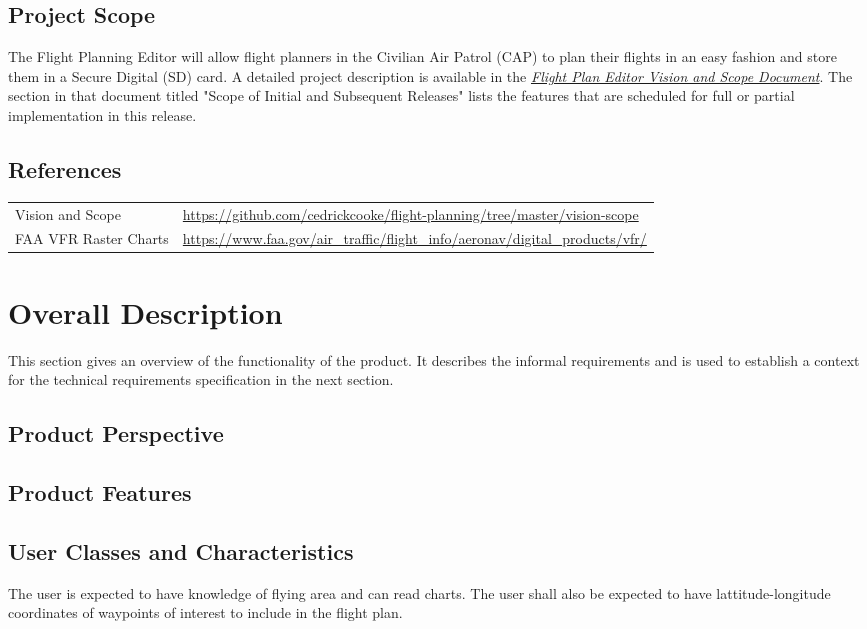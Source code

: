 \documentclass[12pt, letterpaper]{article}
\begin{document}
  \subsection{Project Scope}
  The Flight Planning Editor will allow flight planners in the Civilian Air Patrol (CAP)
  to plan their flights in an easy fashion and store them in a Secure Digital (SD) card.
  A detailed project description is available in the \hyperref[sec:ref]{\textit{Flight Plan Editor Vision and Scope Document}}.
  The section in that document titled "Scope of Initial and Subsequent Releases" lists the features that are
  scheduled for full or partial implementation in this release.
  \subsection{References}\label{sec:ref}
  \begin{tabularx}{\textwidth}{l|X}
    \hline
    Vision and Scope & \url{https://github.com/cedrickcooke/flight-planning/tree/master/vision-scope}\\
    FAA VFR Raster Charts & \url{https://www.faa.gov/air_traffic/flight_info/aeronav/digital_products/vfr/} \\
    \hline
  \end{tabularx}

\section{Overall Description}
  This section gives an overview of the functionality of the product.
  It describes the informal requirements and is used to establish a context for the technical
  requirements specification in the next section.
\subsection{Product Perspective}
  \subsection{Product Features}

  \subsection{User Classes and Characteristics}
    The user is expected to have knowledge of flying area and can read charts.
    The user shall also be expected to have lattitude-longitude coordinates of
    waypoints of interest to include in the flight plan.
\end{document}
